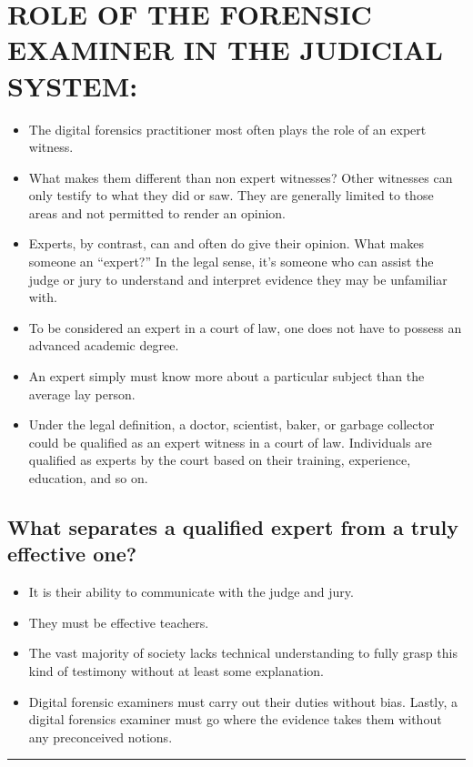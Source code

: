 \documentclass[10pt,british,english]{article}
\begin{document}
\section{ROLE OF THE FORENSIC EXAMINER IN THE JUDICIAL SYSTEM:}
\begin{itemize}
\item The digital forensics practitioner most often plays the role of an
expert witness.
\item What makes them different than non expert witnesses? Other witnesses
can only testify to what they did or saw. They are generally limited
to those areas and not permitted to render an opinion. 
\item Experts, by contrast, can and often do give their opinion. What makes
someone an \textquotedblleft expert?\textquotedblright{} In the legal
sense, it\textquoteright s someone who can assist the judge or jury
to understand and interpret evidence they may be unfamiliar with. 
\item To be considered an expert in a court of law, one does not have to
possess an advanced academic degree. 
\item An expert simply must know more about a particular subject than the
average lay person.
\item Under the legal definition, a doctor, scientist, baker, or garbage
collector could be qualified as an expert witness in a court of law.
Individuals are qualified as experts by the court based on their training,
experience, education, and so on.
\end{itemize}

\subsection{What separates a qualified expert from a truly effective one? }
\begin{itemize}
\item It is their ability to communicate with the judge and jury. 
\item They must be effective teachers. 
\item The vast majority of society lacks technical understanding to fully
grasp this kind of testimony without at least some explanation. 
\item Digital forensic examiners must carry out their duties without bias.
Lastly, a digital forensics examiner must go where the evidence takes
them without any preconceived notions.
\end{itemize}
\rule[0.5ex]{1\columnwidth}{1pt}
\end{document}
